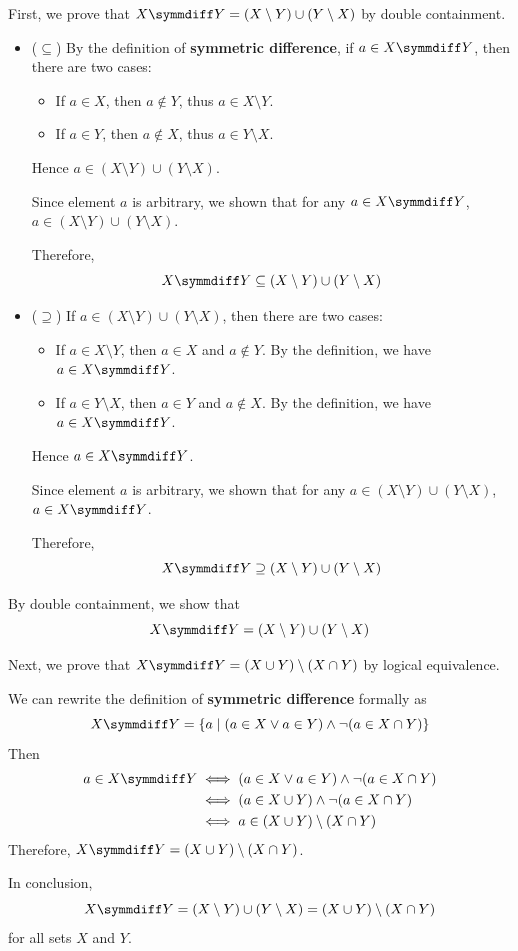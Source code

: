 \begin{myproof}
    First, we prove that $X \symmdiff Y = (X \setminus Y) \cup (Y \setminus X)$ by double containment.
    \begin{itemize}
        \item ($\subseteq$) By the definition of \textbf{symmetric difference}, if $a \in X \symmdiff Y$, then there are two cases:
        \begin{itemize}
        \item If $a \in X$, then $a \notin Y$, thus $a \in X \setminus Y$.
        \item If $a \in Y$, then $a \notin X$, thus $a \in Y \setminus X$.
        \end{itemize}
        Hence $a \in (X \setminus Y) \cup (Y \setminus X)$.

        Since element $a$ is arbitrary, we shown that for any $a \in X \symmdiff Y$, $a \in (X \setminus Y) \cup (Y \setminus X)$. 
        
        Therefore,
        \[X \symmdiff Y \subseteq (X \setminus Y) \cup (Y \setminus X)\]
        \item ($\supseteq$) If $a \in (X \setminus Y) \cup (Y \setminus X)$, then there are two cases:
        \begin{itemize}
        \item If $a \in X \setminus Y$, then $a \in X$ and $a \notin Y$. By the definition, we have $a \in X \symmdiff Y$.
        \item If $a \in Y \setminus X$, then $a \in Y$ and $a \notin X$. By the definition, we have $a \in X \symmdiff Y$.
        \end{itemize}
        Hence $a \in X \symmdiff Y$.

        Since element $a$ is arbitrary, we shown that for any $a \in (X \setminus Y) \cup (Y \setminus X)$, $a \in X \symmdiff Y$. 
        
        Therefore,
        \[X \symmdiff Y \supseteq (X \setminus Y) \cup (Y \setminus X)\]
    \end{itemize}
    By double containment, we show that
    \[X \symmdiff Y = (X \setminus Y) \cup (Y \setminus X)\]
    
    Next, we prove that $X \symmdiff Y = (X \cup Y) \setminus (X \cap Y)$ by logical equivalence.

    We can rewrite the definition of \textbf{symmetric difference} formally as
    \[X \symmdiff Y = \{a \mid (a \in X \lor a \in Y) \land \neg(a \in X \cap Y)\}\]
    Then
    \begin{align*}
        a \in X \symmdiff Y &\iff (a \in X \lor a \in Y) \land \neg(a \in X \cap Y) \\
        &\iff (a \in X \cup Y) \land \neg(a \in X \cap Y) \\
        &\iff a \in (X \cup Y) \setminus (X \cap Y)
    \end{align*}
    Therefore, $X \symmdiff Y = (X \cup Y) \setminus (X \cap Y)$.

    In conclusion,
    \[X \symmdiff Y = (X \setminus Y) \cup (Y \setminus X) = (X \cup Y) \setminus (X \cap Y)\]
    for all sets $X$ and $Y$.
\end{myproof}

